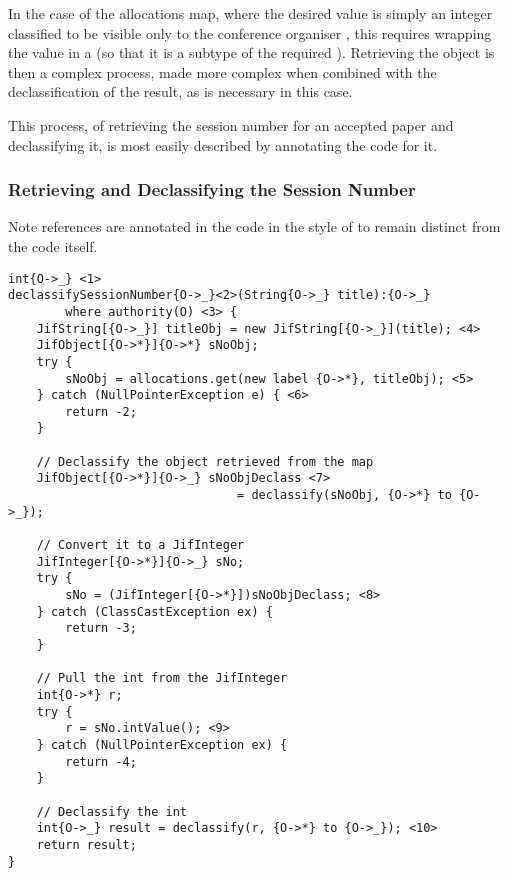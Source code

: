 In the case of the allocations map, where the desired value is simply an integer classified to be visible only to the conference organiser , this requires wrapping the value in a  (so that it is a subtype of the required ). Retrieving the object is then a complex process, made more complex when combined with the declassification of the result, as is necessary in this case.

This process, of retrieving the session number for an accepted paper and declassifying it, is most easily described by annotating the code for it.

\subsubsection{Retrieving and Declassifying the Session Number}
%


Note references are annotated in the code in the style of  to remain distinct from the code itself.

\begin{verbatim}
int{O->_} <1> 
declassifySessionNumber{O->_}<2>(String{O->_} title):{O->_} 
		where authority(O) <3> {
	JifString[{O->_}] titleObj = new JifString[{O->_}](title); <4>
	JifObject[{O->*}]{O->*} sNoObj;
	try {
		sNoObj = allocations.get(new label {O->*}, titleObj); <5>
	} catch (NullPointerException e) { <6>
		return -2;
	}
	
	// Declassify the object retrieved from the map
	JifObject[{O->*}]{O->_} sNoObjDeclass <7> 
								= declassify(sNoObj, {O->*} to {O->_});
	
	// Convert it to a JifInteger
	JifInteger[{O->*}]{O->_} sNo;
	try {
		sNo = (JifInteger[{O->*}])sNoObjDeclass; <8>
	} catch (ClassCastException ex) {
		return -3;
	}
		
	// Pull the int from the JifInteger
	int{O->*} r;
	try {
		r = sNo.intValue(); <9>
	} catch (NullPointerException ex) {
		return -4;
	}
	
	// Declassify the int
	int{O->_} result = declassify(r, {O->*} to {O->_}); <10>
	return result;
}
\end{verbatim}

